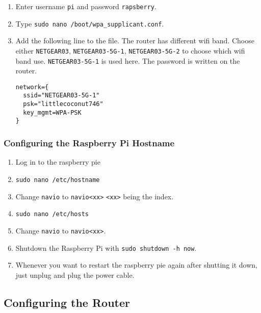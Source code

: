                 \begin{enumerate}
                    \item Enter username \texttt{pi} and password \texttt{rapsberry}.
                    \item Type \texttt{sudo nano /boot/wpa\_supplicant.conf}.
                    \item Add the following line to the file. The router has different wifi band. Choose either \texttt{NETGEAR03}, \texttt{NETGEAR03-5G-1}, \texttt{NETGEAR03-5G-2} to choose which wifi band use. \texttt{NETGEAR03-5G-1} is used here. The password is written on the router.
                    
                    \begin{verbatim}
network={
  ssid="NETGEAR03-5G-1"
  psk="littlecoconut746"
  key_mgmt=WPA-PSK
}
                    \end{verbatim}
                \end{enumerate}

            \subsubsection{Configuring the Raspberry Pi Hostname}
                \begin{enumerate}
                    \item Log in to the raspberry pie
                    \item \texttt{sudo nano /etc/hostname}
                    \item Change \texttt{navio} to \texttt{navio<xx>} \texttt{<xx>} being the index.
                    \item \texttt{sudo nano /etc/hosts}
                    \item Change \texttt{navio} to \texttt{navio<xx>}.
                    \item Shutdown the Raspberry Pi with \texttt{sudo shutdown -h now}.
                    \item Whenever you want to restart the raspberry pie again after shutting it down, just unplug and plug the power cable.
                \end{enumerate}
                
        \subsection{Configuring the Router}

